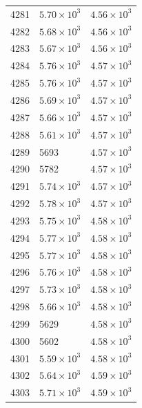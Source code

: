 \begin{table}[H]
\begin{tabular}{lll}
4281 & $\displaystyle 5.70 \times 10^{3}$ & $\displaystyle 4.56 \times 10^{3}$ \\
4282 & $\displaystyle 5.68 \times 10^{3}$ & $\displaystyle 4.56 \times 10^{3}$ \\
4283 & $\displaystyle 5.67 \times 10^{3}$ & $\displaystyle 4.56 \times 10^{3}$ \\
4284 & $\displaystyle 5.76 \times 10^{3}$ & $\displaystyle 4.57 \times 10^{3}$ \\
4285 & $\displaystyle 5.76 \times 10^{3}$ & $\displaystyle 4.57 \times 10^{3}$ \\
4286 & $\displaystyle 5.69 \times 10^{3}$ & $\displaystyle 4.57 \times 10^{3}$ \\
4287 & $\displaystyle 5.66 \times 10^{3}$ & $\displaystyle 4.57 \times 10^{3}$ \\
4288 & $\displaystyle 5.61 \times 10^{3}$ & $\displaystyle 4.57 \times 10^{3}$ \\
4289 & 5693 & $\displaystyle 4.57 \times 10^{3}$ \\
4290 & 5782 & $\displaystyle 4.57 \times 10^{3}$ \\
4291 & $\displaystyle 5.74 \times 10^{3}$ & $\displaystyle 4.57 \times 10^{3}$ \\
4292 & $\displaystyle 5.78 \times 10^{3}$ & $\displaystyle 4.57 \times 10^{3}$ \\
4293 & $\displaystyle 5.75 \times 10^{3}$ & $\displaystyle 4.58 \times 10^{3}$ \\
4294 & $\displaystyle 5.77 \times 10^{3}$ & $\displaystyle 4.58 \times 10^{3}$ \\
4295 & $\displaystyle 5.77 \times 10^{3}$ & $\displaystyle 4.58 \times 10^{3}$ \\
4296 & $\displaystyle 5.76 \times 10^{3}$ & $\displaystyle 4.58 \times 10^{3}$ \\
4297 & $\displaystyle 5.73 \times 10^{3}$ & $\displaystyle 4.58 \times 10^{3}$ \\
4298 & $\displaystyle 5.66 \times 10^{3}$ & $\displaystyle 4.58 \times 10^{3}$ \\
4299 & 5629 & $\displaystyle 4.58 \times 10^{3}$ \\
4300 & 5602 & $\displaystyle 4.58 \times 10^{3}$ \\
4301 & $\displaystyle 5.59 \times 10^{3}$ & $\displaystyle 4.58 \times 10^{3}$ \\
4302 & $\displaystyle 5.64 \times 10^{3}$ & $\displaystyle 4.59 \times 10^{3}$ \\
4303 & $\displaystyle 5.71 \times 10^{3}$ & $\displaystyle 4.59 \times 10^{3}$ \\

\end{tabular}
\end{table}
